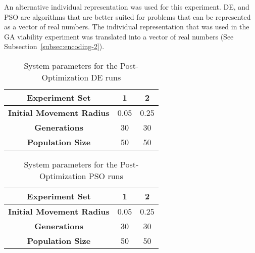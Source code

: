 An alternative individual representation was used for this experiment. DE, and PSO are algorithms that are better suited for problems that can be represented as a vector of real numbers. The individual representation that was used in the GA viability experiment was translated into a vector of real numbers (See Subsection~\ref{subsec:encoding-2}).

\begin{table}
	\centering
	\begin{tabular}{ | >{\bfseries}c | c | c | }
		\hline
		Experiment Set & 1 & 2 \\ \hline
		Initial Movement Radius & 0.05 & 0.25 \\ \hline
		Generations & 30 & 30 \\ \hline
		Population Size & 50 & 50 \\ \hline
	\end{tabular}
	\caption{System parameters for the Post-Optimization DE runs}
	\label{table:post-op-de}
\end{table}

\begin{table}
	\centering
	\begin{tabular}{ | >{\bfseries}c | c | c | }
		\hline
		Experiment Set & 1 & 2 \\ \hline
		Initial Movement Radius & 0.05 & 0.25 \\ \hline
		Generations & 30 & 30 \\ \hline
		Population Size & 50 & 50 \\ \hline
	\end{tabular}
	\caption{System parameters for the Post-Optimization PSO runs}
	\label{table:post-op-pso}
\end{table}
